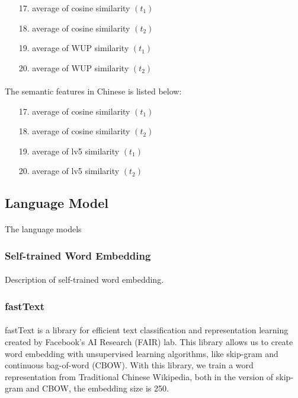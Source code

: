 \documentclass{article}
\begin{document}
\begin{CJK*}{UTF8}{bkai}
\begin{enumerate}
  \item[17.] average of cosine similarity $(t_1)$
  \item[18.] average of cosine similarity $(t_2)$
  \item[19.] average of WUP similarity $(t_1)$
  \item[20.] average of WUP similarity $(t_2)$
\end{enumerate}

\paragraph{}
The semantic features in Chinese is listed below:

\begin{enumerate}
  \item[17.] average of cosine similarity $(t_1)$
  \item[18.] average of cosine similarity $(t_2)$
  \item[19.] average of lv5 similarity $(t_1)$
  \item[20.] average of lv5 similarity $(t_2)$
\end{enumerate}

\subsection{Language Model}
\paragraph{}
The language models

\subsubsection{Self-trained Word Embedding}
\paragraph{}
Description of self-trained word embedding.

\subsubsection{fastText}
\paragraph{}
fastText\cite{bojanowski2016enriching} is a library for efficient text classification and representation learning created by Facebook's AI Research (FAIR) lab. This library allows us to create word embedding with unsupervised learning algorithms, like skip-gram and continuous bag-of-word (CBOW). With this library, we train a word representation from Traditional Chinese Wikipedia, both in the version of skip-gram and CBOW, the embedding size is 250.


\end{CJK*}
\end{document}
